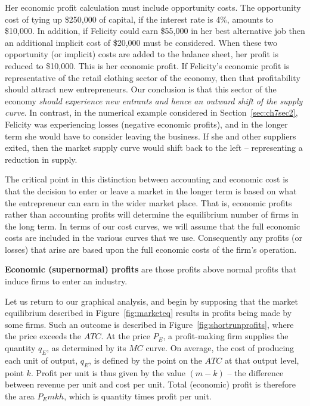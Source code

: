 \newhtmlpage

Her economic profit calculation must include opportunity costs. The
opportunity cost of tying up \$250,000 of capital, if the interest rate is
4\%, amounts to \$10,000. In addition, if Felicity could earn \$55,000 in
her best alternative job then an additional implicit cost of \$20,000 must
be considered. When these two opportunity (or implicit) costs are added to
the balance sheet, her profit is reduced to \$10,000. This is her economic
profit. If Felicity's economic profit is representative of the retail
clothing sector of the economy, then that profitability should attract new
entrepreneurs. Our conclusion is that this sector of the economy 
\textit{should experience new entrants and hence an outward shift of the supply curve}. 
In contrast, in the numerical example considered in Section~\ref{sec:ch7sec2}, Felicity was
experiencing losses (negative economic profits), and in the longer
term she would have to consider leaving the business. If she and other
suppliers exited, then the market supply curve would shift back to the left
-- representing a reduction in supply.

The critical point in this distinction between accounting and economic cost
is that the decision to enter or leave a market in the longer term is based
on what the entrepreneur can earn in the wider market place. That is,
economic profits rather than accounting profits will determine the
equilibrium number of firms in the long term. In terms of our cost curves,
we will assume that the full economic costs are included in the various
curves that we use. Consequently any profits (or losses) that arise are
based upon the full economic costs of the firm's operation.

\begin{DefBox}
	\textbf{Economic (supernormal) profits} are those profits above normal profits that induce firms to enter an industry.
\end{DefBox}

\newhtmlpage

Let us return to our graphical analysis, and begin by supposing that the
market equilibrium described in Figure~\ref{fig:marketeq} results in profits
being made by some firms. Such an outcome is described in 
Figure~\ref{fig:shortrunprofits}, where the price exceeds the $ATC$. At the price 
$P_{E}$, a profit-making firm supplies the quantity $q_{E}$, as determined
by its $MC$ curve. On average, the cost of producing each unit of output, 
$q_{E}$, is defined by the point on the $ATC$ at that output level, point $k$. 
Profit per unit is thus given by the value $(m-k)$ -- the difference
between revenue per unit and cost per unit. Total (economic) profit is
therefore the area $P_{E}mkh$, which is quantity times profit per unit.

